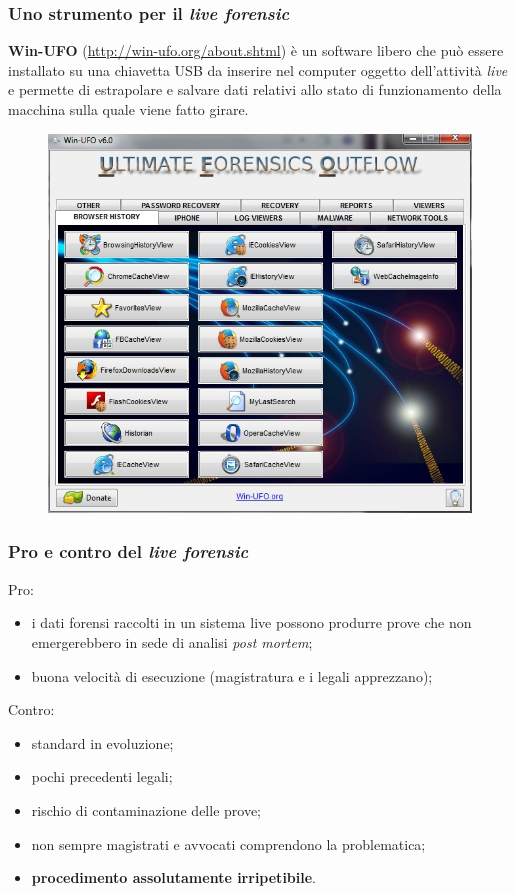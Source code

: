 \documentclass[11pt]{beamer}
\begin{document}
	\begin{frame}[shrink]
			\frametitle{Uno strumento per il \textit{live forensic}}			
			\textbf{Win-UFO} (\url{http://win-ufo.org/about.shtml}) è un software libero che può essere installato su una chiavetta USB da inserire nel computer oggetto dell'attività \textit{live} e permette di estrapolare e salvare dati relativi allo stato di funzionamento della macchina sulla quale viene fatto girare.
			
			\begin{figure}
				\centering
				\includegraphics[width=.4\linewidth]{pics/winufo1}
						
			\end{figure}

			
	\end{frame}
	
	\begin{frame}
		\frametitle{Pro e contro del \textit{live forensic}}
	Pro:
	\begin{itemize}
		\item i dati forensi raccolti in un sistema live possono produrre prove che non emergerebbero in sede di analisi \textit{post mortem};
		\item buona velocità di esecuzione (magistratura e i legali apprezzano);
	\end{itemize}
	\vfill
	Contro:
	\begin{itemize}
		\item standard in evoluzione;
		\item pochi precedenti legali;
		\item rischio di contaminazione delle prove;
		\item non sempre magistrati e avvocati comprendono la problematica;
		\item \textbf{procedimento assolutamente irripetibile}.
	\end{itemize}

	\end{frame}
	
\end{document}

